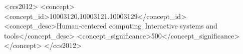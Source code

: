 \begin{CCSXML}
<ccs2012>
<concept>
<concept_id>10003120.10003121.10003129</concept_id>
<concept_desc>Human-centered computing~Interactive systems and tools</concept_desc>
<concept_significance>500</concept_significance>
</concept>
</ccs2012>
\end{CCSXML}
